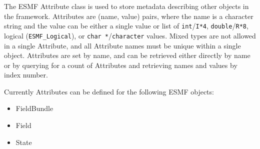 %

The ESMF Attribute class is used to store metadata describing
other objects in the framework.  
Attributes are (name, value) pairs, where
the name is a character string and the value can be either a single
value or list of {\tt int}/{\tt I*4}, {\tt double}/{\tt R*8},
logical ({\tt ESMF\_Logical}), or {\tt char *}/{\tt character} values.
Mixed types are not allowed in a single Attribute, and all Attribute
names must be unique within a single object.    Attributes are set
by name, and can be retrieved either directly by name or by querying
for a count of Attributes and retrieving names and values
by index number.


Currently Attributes can be defined for the following ESMF objects:

\begin{itemize}
\item FieldBundle
\item Field
\item State
\end{itemize}

